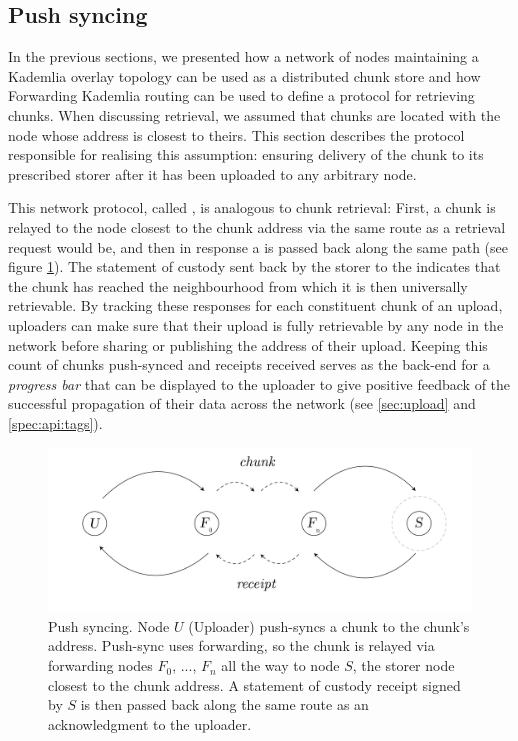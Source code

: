\subsection{Push syncing\statusgreen}\label{sec:push-syncing}
 
In the previous sections, we presented how a network of nodes maintaining a Kademlia overlay topology can be used as a distributed chunk store and how Forwarding Kademlia routing can be used to define a protocol for retrieving chunks.
When discussing retrieval, we assumed that chunks are located with the node whose address is closest to theirs. This section describes the protocol responsible for realising this assumption: ensuring delivery of the chunk to its prescribed storer after it has been uploaded to any arbitrary node.

This network protocol, called , is analogous to chunk retrieval: First, a chunk is relayed to the node closest to the chunk address via the same route as a retrieval request would be, and then in response a  is passed back along the same path (see figure \ref{fig:push-syncing}). The statement of custody sent back by the storer to the  indicates that the chunk has reached the neighbourhood from which it is then universally retrievable. By tracking these responses for each constituent chunk of an upload, uploaders can make sure that their upload is fully retrievable by any node in the network before sharing or publishing the address of their upload. Keeping this count of chunks push-synced and receipts received serves as the back-end for a \emph{progress bar} that can be displayed to the uploader to give positive feedback of the successful propagation of their data across the network (see \ref{sec:upload} and \ref{spec:api:tags}).


\begin{figure}[htbp]
   \centering
   \includegraphics[width=\textwidth]{fig/push-sync.pdf}
   \caption[Push syncing \statusgreen]{Push syncing. Node $U$ (Uploader) push-syncs a chunk to the chunk's address. Push-sync uses forwarding, so the chunk is relayed via forwarding nodes $F_0$, ..., $F_n$ all the way to node $S$, the storer node closest to the chunk address. A statement of custody receipt signed by $S$ is then passed back along the same route as an acknowledgment to the uploader.}
   \label{fig:push-syncing}
\end{figure}

